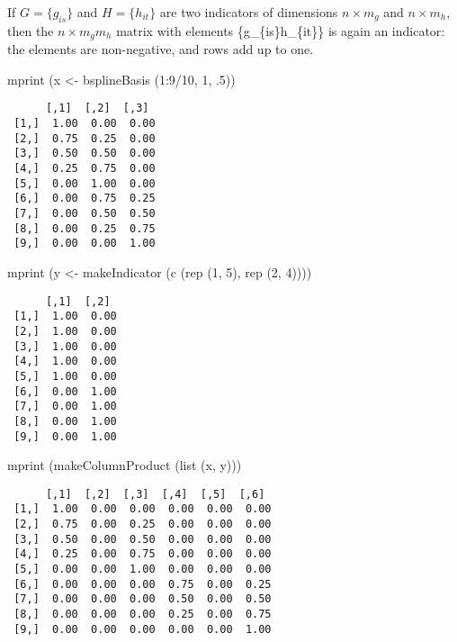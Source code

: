 \documentclass[
  12pt,
  letterpaper,
]{scrbook}
\newenvironment{Shaded}{\begin{snugshade}}{\end{snugshade}}
\newcommand{\DecValTok}[1]{\textcolor[rgb]{0.68,0.00,0.00}{#1}}
\newcommand{\FunctionTok}[1]{\textcolor[rgb]{0.28,0.35,0.67}{#1}}
\newcommand{\NormalTok}[1]{\textcolor[rgb]{0.00,0.23,0.31}{#1}}
\newcommand{\OtherTok}[1]{\textcolor[rgb]{0.00,0.23,0.31}{#1}}
\newcommand{\SpecialCharTok}[1]{\textcolor[rgb]{0.37,0.37,0.37}{#1}}
\begin{document}
If \(G=\{g_{is}\}\) and \(H=\{h_{it}\}\) are two indicators of
dimensions \(n\times m_g\) and \(n\times m_h\), then the
\(n\times m_gm_h\) matrix with elements \{g\_\{is\}h\_\{it\}\} is again
an indicator: the elements are non-negative, and rows add up to one.

\begin{Shaded}
\begin{Highlighting}[]
\FunctionTok{mprint}\NormalTok{ (x }\OtherTok{\textless{}{-}} \FunctionTok{bsplineBasis}\NormalTok{ (}\DecValTok{1}\SpecialCharTok{:}\DecValTok{9}\SpecialCharTok{/}\DecValTok{10}\NormalTok{, }\DecValTok{1}\NormalTok{, .}\DecValTok{5}\NormalTok{))}
\end{Highlighting}
\end{Shaded}

\begin{verbatim}
      [,1]  [,2]  [,3] 
 [1,]  1.00  0.00  0.00
 [2,]  0.75  0.25  0.00
 [3,]  0.50  0.50  0.00
 [4,]  0.25  0.75  0.00
 [5,]  0.00  1.00  0.00
 [6,]  0.00  0.75  0.25
 [7,]  0.00  0.50  0.50
 [8,]  0.00  0.25  0.75
 [9,]  0.00  0.00  1.00
\end{verbatim}

\begin{Shaded}
\begin{Highlighting}[]
\FunctionTok{mprint}\NormalTok{ (y }\OtherTok{\textless{}{-}} \FunctionTok{makeIndicator}\NormalTok{ (}\FunctionTok{c}\NormalTok{ (}\FunctionTok{rep}\NormalTok{ (}\DecValTok{1}\NormalTok{, }\DecValTok{5}\NormalTok{), }\FunctionTok{rep}\NormalTok{ (}\DecValTok{2}\NormalTok{, }\DecValTok{4}\NormalTok{))))}
\end{Highlighting}
\end{Shaded}

\begin{verbatim}
      [,1]  [,2] 
 [1,]  1.00  0.00
 [2,]  1.00  0.00
 [3,]  1.00  0.00
 [4,]  1.00  0.00
 [5,]  1.00  0.00
 [6,]  0.00  1.00
 [7,]  0.00  1.00
 [8,]  0.00  1.00
 [9,]  0.00  1.00
\end{verbatim}

\begin{Shaded}
\begin{Highlighting}[]
\FunctionTok{mprint}\NormalTok{ (}\FunctionTok{makeColumnProduct}\NormalTok{ (}\FunctionTok{list}\NormalTok{ (x, y)))}
\end{Highlighting}
\end{Shaded}

\begin{verbatim}
      [,1]  [,2]  [,3]  [,4]  [,5]  [,6] 
 [1,]  1.00  0.00  0.00  0.00  0.00  0.00
 [2,]  0.75  0.00  0.25  0.00  0.00  0.00
 [3,]  0.50  0.00  0.50  0.00  0.00  0.00
 [4,]  0.25  0.00  0.75  0.00  0.00  0.00
 [5,]  0.00  0.00  1.00  0.00  0.00  0.00
 [6,]  0.00  0.00  0.00  0.75  0.00  0.25
 [7,]  0.00  0.00  0.00  0.50  0.00  0.50
 [8,]  0.00  0.00  0.00  0.25  0.00  0.75
 [9,]  0.00  0.00  0.00  0.00  0.00  1.00
\end{verbatim}
\end{document}
